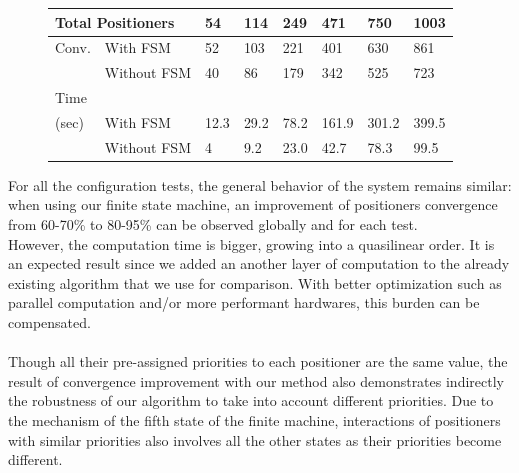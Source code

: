 \documentclass[]{spie}  %
\begin{document}
\begin{figure}[H]
\begin{minipage}{9cm}
{				\tiny
				\begin{tabular}{|l|l|l|l|l|l|l|l|}
					\hline
					\multicolumn{2}{|l|}{Total Positioners}  & 54 & 114 & 249 & 471 & 750 & 1003\\
					\hline
					Conv. & With FSM  & 52 & 103 & 221 & 401 & 630 & 861 \\
					\cline{2-8}
					& Without FSM & 40  & 86 & 179 & 342 & 525 & 723 \\
					\hline
					Time\\(sec) & With FSM  & 12.3 & 29.2 & 78.2 & 161.9 & 301.2 & 399.5 \\
					\cline{2-8}
					& Without FSM  & 4  & 9.2 & 23.0 & 42.7 & 78.3  & 99.5 \\
					\hline
				\end{tabular}}
				\label{configuration8_result} 
			\end{minipage}
		\end{figure}					
	For all the configuration tests, the general behavior of the system remains similar: when using our finite state machine, an improvement of positioners convergence from 60-70\% to 80-95\% can be observed globally and for each test.\\
	 However, the computation time is bigger, growing into a quasilinear order. It is an expected result since we added an another layer of computation to the already existing algorithm that we use for comparison. With better optimization such as parallel computation and/or more performant hardwares, this burden can be compensated.\\\\
	 Though all their pre-assigned priorities to each positioner are the same value, the result of convergence improvement with our method also demonstrates indirectly the robustness of our algorithm to take into account different priorities. Due to the mechanism of the fifth state of the finite machine, interactions of positioners with similar priorities also involves all the other states as their priorities become different. \\\\
	
\end{document}
